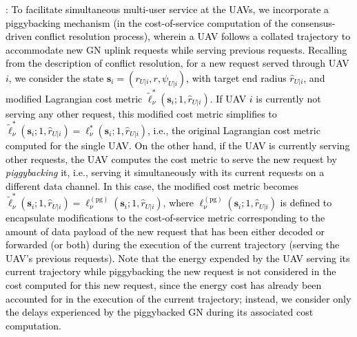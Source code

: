 \documentclass[10pt, twocolumn]{IEEEtran}
\theoremstyle{plain}
\theoremstyle{definition}
\theoremstyle{remark}
\newcommand\hlt[1]{\textcolor{black}{#1}}
\begin{document}
\label{pb_label}
\noindent{\hlt{\textbf{Piggybacking}}}: \hlt{To facilitate simultaneous multi-user service at the UAVs, we incorporate a piggybacking mechanism (in the cost-of-service computation of the consensus-driven conflict resolution process), wherein a UAV follows a collated trajectory to accommodate new GN uplink requests while serving previous requests. Recalling from the description of conflict resolution, for a new request served through UAV $i$, we consider the state $\mathbf s_i = \left( r_{U|i}, r, \psi_{U|i} \right)$, with target end radius $\hat r_{U|i}$, and modified Lagrangian cost metric $\tilde{\ell}_{\nu}^{*} (\mathbf s_i; 1, \hat r_{U|i} )$. If UAV $i$ is currently not serving any other request, this modified cost metric simplifies to $\tilde{\ell}_{\nu}^* (\mathbf s_i; 1, \hat r_{U|i}) {=} \ell_{\nu}^* (\mathbf s_i; 1, \hat r_{U|i})$, i.e., the original Lagrangian cost metric computed for the single UAV. On the other hand, if the UAV is currently serving other requests, the UAV computes the cost metric to serve the new request by \emph{piggybacking} it, i.e., serving it simultaneously with its current requests on a different data channel. In this case, the modified cost metric becomes $\tilde{\ell}_{\nu}^* (\mathbf s_i ; 1, \hat r_{U|i} ) {=} \ell_{\nu}^{(\mathrm{pg})} (\mathbf s_i; 1, \hat r_{U|i})$, where $\ell_{\nu}^{(\mathrm{pg})} (\mathbf s_i; 1, \hat r_{U|i})$ is defined to encapsulate modifications to the cost-of-service metric corresponding to the amount of data payload of the new request that has been either decoded or forwarded (or both) during the execution of the current trajectory (serving the UAV's previous requests). Note that the energy expended by the UAV serving its current trajectory while piggybacking the new request is not considered in the cost computed for this new request, since the energy cost has already been accounted for in the execution of the current trajectory; instead, we consider only the delays experienced by the piggybacked GN during its associated cost computation.}
\end{document}
